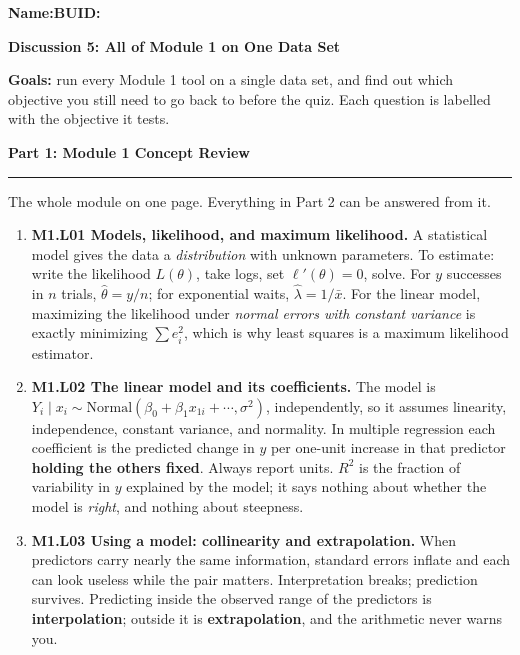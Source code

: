 \documentclass[11pt]{article}
\newcommand{\blankline}[1]{\underline{\hspace{#1}}}
\newcommand{\parttitle}[1]{%
  \par\medskip\noindent
  {\large\bfseries #1}\par
  \vspace{-.5em}\noindent\rule{\linewidth}{0.4pt}\par\smallskip}
\begin{document}
\noindent\textbf{Name:}\blankline{2.3in}\hfill\textbf{BUID:}\blankline{1.6in}

\begin{center}
  {\Large\bfseries Discussion 5: All of Module 1 on One Data Set}
\end{center}

\noindent\textbf{Goals:} run every Module 1 tool on a single data set, and find out which
objective you still need to go back to before the quiz. Each question is labelled with the
objective it tests.

\parttitle{Part 1: Module 1 Concept Review}

{\small

\noindent The whole module on one page. Everything in Part 2 can be answered from it.

\begin{enumerate}[label=\textbf{\arabic*.}, wide=0pt, itemsep=.45em, topsep=.5em]

\item \textbf{M1.L01 Models, likelihood, and maximum likelihood.} A statistical model gives the
data a \emph{distribution} with unknown parameters. To estimate: write the likelihood $L(\theta)$,
take logs, set $\ell'(\theta)=0$, solve. For $y$ successes in $n$ trials,
$\hat\theta = y/n$; for exponential waits, $\hat\lambda = 1/\bar{x}$. For the linear model,
maximizing the likelihood under \emph{normal errors with constant variance} is exactly
minimizing $\sum e_i^2$, which is why least squares is a maximum likelihood estimator.

\item \textbf{M1.L02 The linear model and its coefficients.} The model is
$Y_i \mid x_i \sim \text{Normal}(\beta_0 + \beta_1 x_{1i} + \cdots, \sigma^2)$, independently, so
it assumes linearity, independence, constant variance, and normality. In multiple regression each
coefficient is the predicted change in $y$ per one-unit increase in that predictor
\textbf{holding the others fixed}. Always report units. $R^2$ is the fraction of variability in
$y$ explained by the model; it says nothing about whether the model is \emph{right}, and nothing
about steepness.

\item \textbf{M1.L03 Using a model: collinearity and extrapolation.} When predictors carry nearly
the same information, standard errors inflate and each can look useless while the pair matters.
Interpretation breaks; prediction survives. Predicting inside the observed range of the predictors
is \textbf{interpolation}; outside it is \textbf{extrapolation}, and the arithmetic never warns you.


\end{enumerate}}
\end{document}
